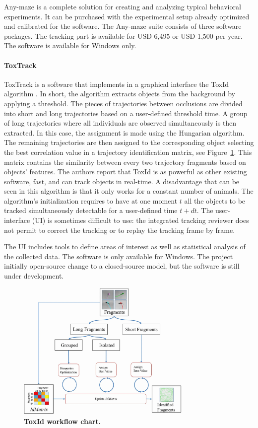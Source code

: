     Any-maze is a complete solution for creating and analyzing typical behavioral experiments. It can be purchased with the experimental setup already optimized and calibrated for the software. The Any-maze suite consists of three software packages. The tracking part is available for USD 6,495 or USD 1,500 per year. The software is available for Windows only.

    \paragraph{ToxTrack}
    ToxTrack \cite{rodriguez2018toxtrac} is a software that implements in a graphical interface the ToxId algorithm \cite{rodriguez2017toxid}. In short, the algorithm extracts objects from the background by applying a threshold. The pieces of trajectories between occlusions are divided into short and long trajectories based on a user-defined threshold time. A group of long trajectories where all individuals are observed simultaneously is then extracted. In this case, the assignment is made using the Hungarian algorithm. The remaining trajectories are then assigned to the corresponding object selecting the best correlation value in a trajectory identification matrix, see Figure~\ref{part_1:toxId}. This matrix contains the similarity between every two trajectory fragments based on objects' features.
    The authors report that ToxId is as powerful as other existing software, fast, and can track objects in real-time. A disadvantage that can be seen in this algorithm is that it only works for a constant number of animals. The algorithm's initialization requires to have at one moment $t$ all the objects to be tracked simultaneously detectable for a user-defined time $t+dt$. The user-interface (UI) is sometimes difficult to use: the integrated tracking reviewer does not permit to correct the tracking or to replay the tracking frame by frame.

    The UI includes tools to define areas of interest as well as statistical analysis of the collected data. The software is only available for Windows. The project initially open-source change to a closed-source model, but the software is still under development.

    \begin{figure}[h]
    \centering
    \includegraphics[width=0.75\textwidth]{part_1/assets/toxId.png}
    \caption{{\bf ToxId workflow chart.}}
    \label{part_1:toxId}
    \end{figure}

